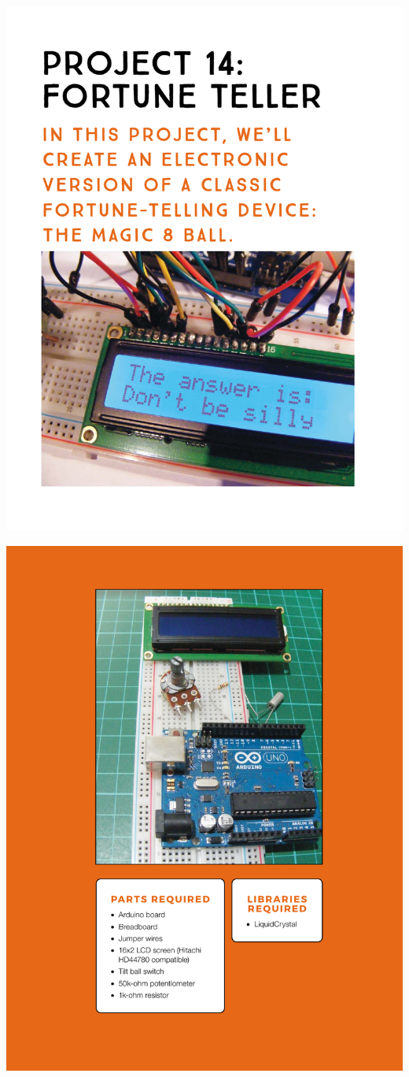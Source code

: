 \documentclass[11pt]{article}
\author{John Harwell}
\date{\today}
\title{}
\begin{document}
\begin{center}
\includegraphics[width=.9\linewidth]{./exp4-magic-8ball-1.pdf}
\end{center}

\begin{center}
\includegraphics[width=.9\linewidth]{./exp4-magic-8ball-2.pdf}
\end{center}
\end{document}
